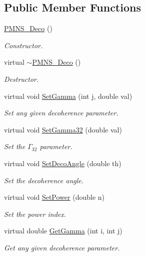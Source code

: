 \subsection*{Public Member Functions}
\begin{DoxyCompactItemize}
\item 
\hyperlink{classOscProb_1_1PMNS__Deco_a976dc43bb65547af5f4a27f5a8fccbba}{P\+M\+N\+S\+\_\+\+Deco} ()
\begin{DoxyCompactList}\small\item\em Constructor. \end{DoxyCompactList}\item 
virtual \hyperlink{classOscProb_1_1PMNS__Deco_a5539610ab44c510c204ae884fb8e2a0e}{$\sim$\+P\+M\+N\+S\+\_\+\+Deco} ()
\begin{DoxyCompactList}\small\item\em Destructor. \end{DoxyCompactList}\item 
virtual void \hyperlink{classOscProb_1_1PMNS__Deco_ac06a9c503d1c5b4a43c4eb797881898d}{Set\+Gamma} (int j, double val)
\begin{DoxyCompactList}\small\item\em Set any given decoherence parameter. \end{DoxyCompactList}\item 
virtual void \hyperlink{classOscProb_1_1PMNS__Deco_a1bc2d1fb1bab9841baa37eecc0135fe9}{Set\+Gamma32} (double val)
\begin{DoxyCompactList}\small\item\em Set the $\Gamma_{32}$ parameter. \end{DoxyCompactList}\item 
virtual void \hyperlink{classOscProb_1_1PMNS__Deco_a35e79054682aa88c55f4350c29336014}{Set\+Deco\+Angle} (double th)
\begin{DoxyCompactList}\small\item\em Set the decoherence angle. \end{DoxyCompactList}\item 
virtual void \hyperlink{classOscProb_1_1PMNS__Deco_afe7b8b9ae438d8b207bf75c2cfbb9fb8}{Set\+Power} (double n)
\begin{DoxyCompactList}\small\item\em Set the power index. \end{DoxyCompactList}\item 
virtual double \hyperlink{classOscProb_1_1PMNS__Deco_a73461e806063588a8e3a9d5d0dd201cb}{Get\+Gamma} (int i, int j)
\begin{DoxyCompactList}\small\item\em Get any given decoherence parameter. \end{DoxyCompactList}\item 

\end{DoxyCompactItemize}
